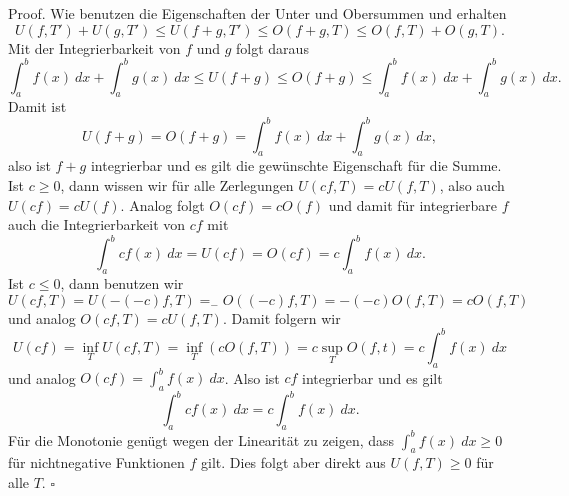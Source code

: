 \begin{emphBox}{}{}
Proof. Wie benutzen die Eigenschaften der Unter  und Obersummen und erhalten
\begin{equation*}
 U(f,T') + U(g,T') \leq U(f+g,T') \leq O(f+g,T) \leq O(f,T) + O(g,T) .
\end{equation*}
Mit der Integrierbarkeit von \(f\) und \(g\) folgt daraus
\begin{equation*}
 \int_a^b f(x)~dx + \int_a^b g(x)~dx \leq U(f+g) \leq O(f+g) \leq \int_a^b f(x)~dx + \int_a^b g(x)~dx.
\end{equation*}
Damit ist
\begin{equation*}
 U(f+g) = O(f+g) = \int_a^b f(x)~dx + \int_a^b g(x)~dx,
\end{equation*}
also ist \(f+g\) integrierbar und es gilt die gewünschte Eigenschaft für die Summe.
Ist \(c \geq 0\), dann wissen wir für alle Zerlegungen
\( U(cf,T) = c U(f,T)\), also auch \(U(cf) = c U(f)\). Analog folgt \(O(cf) = c O(f)\) und damit für integrierbare \(f\) auch die
Integrierbarkeit von \(c f\) mit
\begin{equation*}
  \int_a^b c f(x)~dx = U(cf) = O(cf) = c  \int_a^b f(x)~dx.
\end{equation*}
Ist \(c \leq 0\), dann benutzen wir
\begin{equation*}
 U(cf,T) = U(-(-c)f,T) = _- O((-c)f,T) = - (-c) O(f,T) = c O(f,T)
\end{equation*}
und analog \(O(cf,T) = c U(f,T)\). Damit folgern wir
\begin{equation*}
 U(cf) = \inf_T U(cf,T) = \inf_T (c O(f,T)) = c \sup_T O(f,t) = c \int_a^b f(x)~dx
\end{equation*}
und analog \(O(cf) = \int_a^b f(x)~dx \). Also ist \(cf\) integrierbar und es gilt
\begin{equation*}
  \int_a^b c f(x)~dx = c \int_a^b f(x)~dx.
\end{equation*}
Für die Monotonie genügt wegen der Linearität zu zeigen, dass \(\int_a^b f(x)~dx \geq 0\) für nichtnegative Funktionen \(f\) gilt. Dies folgt aber direkt aus \(U(f,T) \geq 0\) für alle \(T\). \(\square\)
\end{emphBox}

